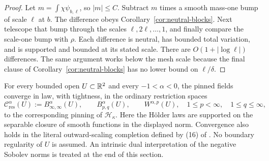 \begin{proof}
Let \(m=\int\chi\psi_{b,\ell}\), so \(|m|\le C\).
Subtract \(m\) times a smooth mass-one bump of scale \(\ell\) at \(b\).
The difference obeys Corollary~\ref{cor:neutral-blocks}.
Next telescope that bump through the scales
\(\ell,2\ell,\ldots,1\), and finally compare the scale-one bump with
\(\rho\). Each difference is neutral, has bounded total variation,
and is supported and bounded at its stated scale. There are
\(O(1+|\log\ell|)\) differences. The same argument works below the mesh
scale because the final clause of Corollary~\ref{cor:neutral-blocks}
has no lower bound on \(\ell/\delta\).
\end{proof}

\begin{proposition}\label{prop:negative-regularity}
For every bounded open \(U\subset\mathbb R^2\) and every \(-1<\alpha<0\),
the pinned fields converge in law, with tightness, in the ordinary
restriction spaces
\[
 \mathcal C^\alpha_{\mathrm{res}}(U):=B^\alpha_{\infty,\infty}(U),\qquad
 B^\alpha_{p,q}(U),\qquad W^{\alpha,p}(U),
 \quad 1\le p<\infty,\quad1\le q\le\infty,
\]
to the corresponding pinning of \(\mathcal H_\kappa\).
Here the Hölder laws are supported on the separable closure of smooth
functions in the displayed norm. Convergence also holds in the literal
outward-scaling completion defined by (16) of
\cite[Definition~2.6(iii)]{DKLM2026}. No boundary regularity of \(U\) is
assumed. An intrinsic dual interpretation of the negative Sobolev norms
is treated at the end of this section.
\end{proposition}

